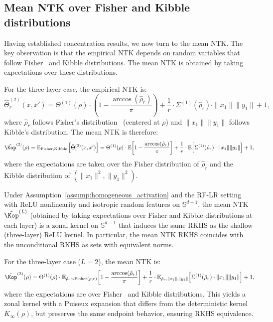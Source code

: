 \vspace{0.5em}
\subsection{Mean NTK over Fisher and Kibble distributions}\label{subsec:conditional-mean-ntk}
Having established concentration results, we now turn to the mean NTK. The key observation is that the empirical NTK depends on random variables that follow Fisher~\cite{fisher1915probable,hotelling1953new} and Kibble distributions. The mean NTK is obtained by taking expectations over these distributions.

For the three-layer case, the empirical NTK is:
\[
\hat{\Theta}^{(2)}_r(x,x') = \Theta^{(1)}(\rho) \cdot \left(1 - \frac{\arccos(\hat{\rho}_r)}{\pi}\right) + \frac{1}{r} \cdot \Sigma^{(1)}(\hat{\rho}_r) \cdot \|x_1\|\|y_1\| + 1,
\]
where \( \hat{\rho}_r \) follows Fisher's distribution~\cite{fisher1915probable,hotelling1953new} (centered at \( \rho \)) and \( \|x_1\|\|y_1\| \) follows Kibble's distribution. The mean NTK is therefore:
\[
\tilde{\Kop}^{(2)}(\rho) = \mathbb{E}_{\text{Fisher}, \text{Kibble}}\left[\hat{\Theta}^{(2)}_r(x,x')\right] = \Theta^{(1)}(\rho) \cdot \mathbb{E}\!\left[1 - \frac{\arccos(\hat{\rho}_r)}{\pi}\right] + \frac{1}{r} \cdot \mathbb{E}\!\left[\Sigma^{(1)}(\hat{\rho}_r) \cdot \|x_1\|\|y_1\|\right] + 1,
\]
where the expectations are taken over the Fisher distribution of \( \hat{\rho}_r \) and the Kibble distribution of \( (\|x_1\|^2, \|y_1\|^2) \).

\begin{corollary}\label{cor:conditional_rkhs_homogeneous}
Under Assumption~\ref{assump:homogeneous_activation} and the RF-LR setting with ReLU nonlinearity and isotropic random features on \( \mathbb{S}^{d-1} \), the mean NTK \( \tilde{\Kop}^{(L)} \) (obtained by taking expectations over Fisher and Kibble distributions at each layer) is a zonal kernel on \( \mathbb{S}^{d-1} \) that induces the same RKHS as the shallow (three-layer) ReLU kernel. In particular, the mean NTK RKHS coincides with the unconditional RKHS as sets with equivalent norms.

For the three-layer case (\( L=2 \)), the mean NTK is:
\[
\tilde{\Kop}^{(2)}(\rho) = \Theta^{(1)}(\rho) \cdot \mathbb{E}_{\hat{\rho}_r \sim \text{Fisher}(\rho,r)}\!\left[1 - \frac{\arccos(\hat{\rho}_r)}{\pi}\right] + \frac{1}{r} \cdot \mathbb{E}_{\hat{\rho}_r, \|x_1\|, \|y_1\|}\!\left[\Sigma^{(1)}(\hat{\rho}_r) \cdot \|x_1\|\|y_1\|\right] + 1,
\]
where the expectations are over Fisher~\cite{fisher1915probable,hotelling1953new} and Kibble distributions. This yields a zonal kernel with a Puiseux expansion that differs from the deterministic kernel \( K_{\infty}(\rho) \), but preserves the same endpoint behavior, ensuring RKHS equivalence.
\end{corollary}

